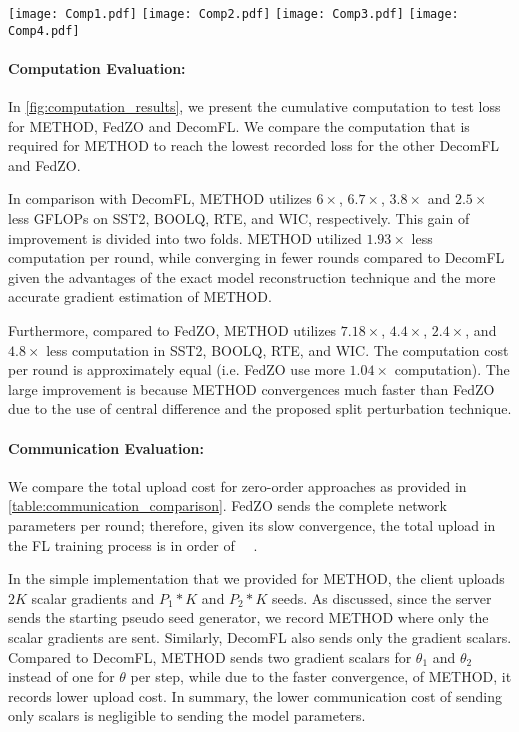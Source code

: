 

\begin{figure*}[t!]
    \centering
    \texttt{[image: Comp1.pdf]}
    \texttt{[image: Comp2.pdf]}
    \texttt{[image: Comp3.pdf]}
    \texttt{[image: Comp4.pdf]}
    \caption{Computation vs test loss comparison for \ac{METHOD} (ours) and other zero-order \ac{FL} methods. \ac{METHOD} records up to $6.7\times$ and $7\times$ less computation compared to FedZO and DecomFL respectively.}
    \label{fig:computation_results}
\end{figure*}


\paragraph{Computation Evaluation:}
In \cref{fig:computation_results}, we present the cumulative computation to test loss for \ac{METHOD}, FedZO and DecomFL. We compare the computation that is required for \ac{METHOD} to reach the lowest recorded loss for the other DecomFL and FedZO. 

In comparison with DecomFL, \ac{METHOD} utilizes  $6\times$, $6.7\times$, $3.8\times$ and $2.5\times$ less G\acp{FLOP} on SST2, BOOLQ, RTE, and WIC, respectively. This gain of improvement is divided into two folds. \ac{METHOD} utilized $1.93\times$ less computation per round, while converging in fewer rounds compared to DecomFL given the advantages of the exact model reconstruction technique and the more accurate gradient estimation of \ac{METHOD}.  

Furthermore, compared to FedZO, \ac{METHOD} utilizes $7.18\times$, $4.4\times$, $2.4\times$, and $4.8\times$ less computation in SST2, BOOLQ, RTE, and WIC. The computation cost per round is approximately equal (i.e. FedZO use more $1.04\times$ computation). The large improvement is because \ac{METHOD} convergences much faster than FedZO due to the use of central difference and the proposed split perturbation technique. 


\paragraph{Communication Evaluation:}
We compare the total upload cost for zero-order approaches as provided in \cref{table:communication_comparison}. FedZO sends the complete network parameters per round; therefore, given its slow convergence, the total upload in the \ac{FL} training process is in order of \SI{}{\tera \byte}. 

In the simple implementation that we provided for \ac{METHOD}, the client uploads $2K$ scalar gradients and $P_{1}*K$ and $P_{2}*K$ seeds. As discussed, since the server sends the starting pseudo seed generator, we record \ac{METHOD} where only the scalar gradients are sent. Similarly, DecomFL also sends only the gradient scalars. Compared to DecomFL, \ac{METHOD} sends two gradient scalars for $\theta_{1}$ and $\theta_{2}$ instead of one for $\theta$ per step, while due to the faster convergence, of \ac{METHOD}, it records lower upload cost. In summary, the lower communication cost of sending only scalars is negligible to sending the model parameters. 



